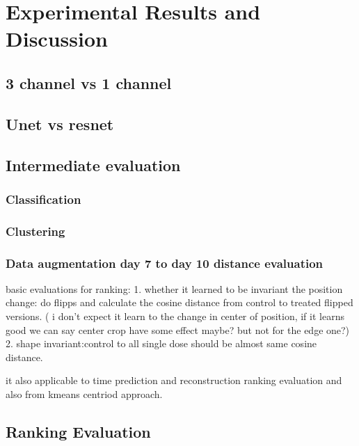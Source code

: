 \chapter{Experimental Results and Discussion} \label{chapter:experimental results and Discussion} 

\section{3 channel vs 1 channel}
\section{Unet vs resnet}



\section{Intermediate evaluation}
\subsection{Classification} \label{subsection:classification}

\subsection{Clustering} \label{subsection:kmeans}

\subsection{Data augmentation  day 7 to day 10 distance evaluation} \label{subsection:day7today10distance}
basic evaluations for ranking:
1.
whether it learned to be invariant the position change:
do flipps and calculate the cosine distance from control to treated flipped versions. ( i don't expect it learn to the change in center of position, 
if it learns good we can say center crop have some effect maybe? but not for the edge one?)
2. 
shape invariant:control to all single dose should be almost same cosine distance.

it also applicable to time prediction and reconstruction ranking evaluation and also from kmeans centriod approach.



\section{Ranking Evaluation}

